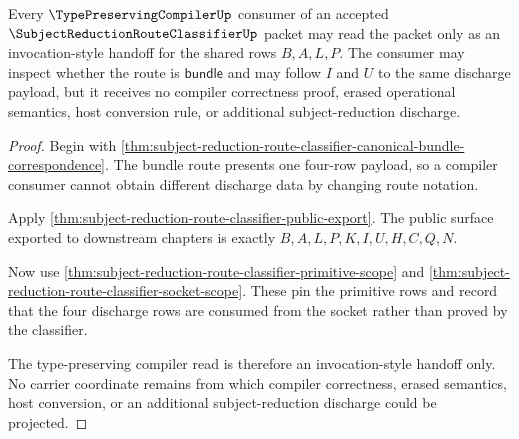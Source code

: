\begin{theorem}
\label{thm:subject-reduction-route-classifier-type-preserving-scope}
Every $\TypePreservingCompilerUp$ consumer of an accepted $\SubjectReductionRouteClassifierUp$ packet may read the packet only as an invocation-style handoff for the shared rows $B,A,L,P$. The consumer may inspect whether the route is $\mathsf{bundle}$ and may follow $I$ and $U$ to the same discharge payload, but it receives no compiler correctness proof, erased operational semantics, host conversion rule, or additional subject-reduction discharge.
\end{theorem}
\begin{proof}
Begin with \autoref{thm:subject-reduction-route-classifier-canonical-bundle-correspondence}. The bundle route presents one four-row payload, so a compiler consumer cannot obtain different discharge data by changing route notation.

Apply \autoref{thm:subject-reduction-route-classifier-public-export}. The public surface exported to downstream chapters is exactly $B,A,L,P,K,I,U,H,C,Q,N$.

Now use \autoref{thm:subject-reduction-route-classifier-primitive-scope} and \autoref{thm:subject-reduction-route-classifier-socket-scope}. These pin the primitive rows and record that the four discharge rows are consumed from the socket rather than proved by the classifier.

The type-preserving compiler read is therefore an invocation-style handoff only. No carrier coordinate remains from which compiler correctness, erased semantics, host conversion, or an additional subject-reduction discharge could be projected.
\end{proof}

